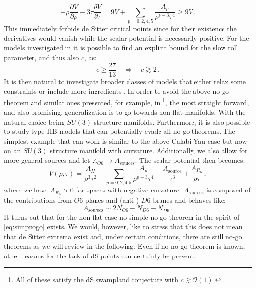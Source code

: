 \documentclass[a4paper,12pt]{report}
\newcommand{\be}{\begin{equation}}
\newcommand{\ee}{\end{equation}}
\begin{document}
\be 
-\rho \frac{\partial V}{\partial \rho} - 3 \tau \frac{\partial V}{\partial \tau} = 9 V + \sum_{p=0,2,4,5} \frac{A_p}{\rho^ {p-3} \tau^4} \geq 9V\,.
\label{eq:simpnogo}
\ee
This immediately forbids de Sitter critical points since for their existence the derivatives would vanish while the scalar potential is necessarily positive. For the models investigated in \cite{Hertzberg:2007wc} it is possible to find an explicit bound for the slow roll parameter, and thus also $c$, as:
\be 
\epsilon \geq \frac{27}{13} \quad \Rightarrow \quad c \gtrsim 2\,.
\ee 
It is then natural to investigate broader classes of models that either relax some constraints or include more ingredients \cite{Caviezel:2008tf,Flauger:2008ad,Saltman:2004jh,Silverstein:2007ac,Haque:2008jz,Danielsson:2009ff,deCarlos:2009fq,deCarlos:2009qm,Caviezel:2009tu,Danielsson:2010bc,Dong:2010pm,Andriot:2010ju}. In order to avoid the above no-go theorem and similar ones presented, for example, in \cite{Flauger:2008ad,Silverstein:2007ac,Haque:2008jz,Danielsson:2009ff,Caviezel:2009tu,Caviezel:2008ik,Wrase:2010ew,Andriot:2016xvq,Andriot:2017jhf}\footnote{All of these satisfy the dS swampland conjecture with $c \gtrsim \mathcal{O}(1)$.}, the most straight forward, and also promising, generalization is to go towards non-flat manifolds. With the natural choice being $SU(3)$ structure manifolds. Furthermore, it is also possible to study type IIB models that can potentially evade all no-go theorems. The simplest example that can work is similar to the above Calabi-Yau case but now on an $SU(3)$ structure manifold with curvature. Additionally, we also allow for more general sources and let $A_{O6} \to A_{\text{sources}}$. The scalar potential then becomes:
\be 
V(\rho,\tau) = \frac{A_H}{\rho^3 \tau^2} + \sum_{p=0,2,4,5} \frac{A_p}{\rho^ {p-3} \tau^4} - \frac{A_{\text{source}}}{\tau^3} + \frac{A_{R_6}}{\rho\tau}\,,
\label{eq:genscal}
\ee
where we have $A_{R_6}>0$ for spaces with negative curvature. $A_{\text{sources}}$ is composed of the contributions from $O6$-planes and (anti-) $D6$-branes and behaves like:
\be
A_{\text{sourecs}} \sim 2 N_{O6} - N_{D6} - N_{\overline{D6}}\,.
\ee
It turns out that for the non-flat case no simple no-go theorem in the spirit of \eqref{eq:simpnogo} exists. We would, however, like to stress that this does not mean that de Sitter extrema exist \cite{Obied:2018sgi} and, under certain conditions, there are still no-go theorems as we will review in the following. Even if no no-go theorem is known, other reasons for the lack of dS points can certainly be present.
\end{document}
